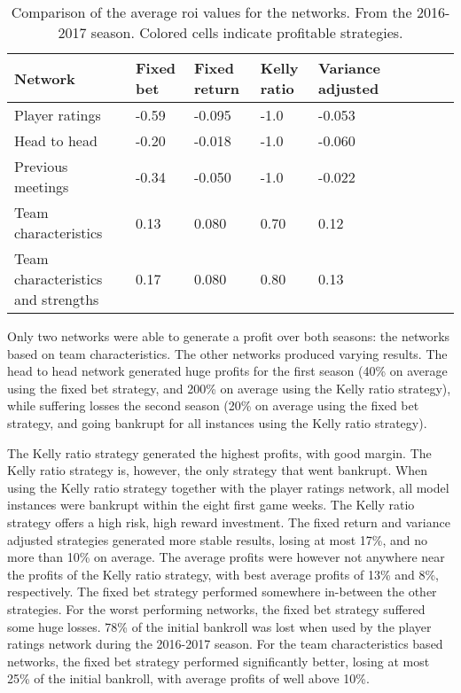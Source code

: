 \begin{table}
    \centering
    \begin{tabulary}{\textwidth}{| L || L |  L |  L |  L | L |  L |  L |  L |}
        \hline
        \textbf{Network}                    & \textbf{Fixed bet}        & \textbf{Fixed return}     & \textbf{Kelly ratio}      & \textbf{Variance adjusted} \\\hline
        Player ratings                      & -0.59                     & -0.095                    & -1.0                      & -0.053 \\\hline
        Head to head                        & -0.20                     & -0.018                    & -1.0                      & -0.060 \\\hline
        Previous meetings                   & -0.34                     & -0.050                    & -1.0                      & -0.022 \\\hline
        Team characteristics                &  0.13  &  0.080 &  0.70  &  0.12 \\\hline
        Team characteristics and strengths  &  0.17  &  0.080 &  0.80  &  0.13 \\\hline
    \end{tabulary}
    \caption{Comparison of the average \gls{roi} values for the networks. From the 2016-2017 season. Colored cells indicate profitable strategies.}
    \label{tab:results-model-comparison-2016-2017}
\end{table}

Only two networks were able to generate a profit over both seasons: the networks based on team characteristics. The other networks produced varying results. The head to head network generated huge profits for the first season (40\% on average using the fixed bet strategy, and 200\% on average using the Kelly ratio strategy), while suffering losses the second season (20\% on average using the fixed bet strategy, and going bankrupt for all instances using the Kelly ratio strategy).

The Kelly ratio strategy generated the highest profits, with good margin. The Kelly ratio strategy is, however, the only strategy that went bankrupt. When using the Kelly ratio strategy together with the player ratings network, all model instances were bankrupt within the eight first game weeks. The Kelly ratio strategy offers a high risk, high reward investment. The fixed return and variance adjusted strategies generated more stable results, losing at most 17\%, and no more than 10\% on average. The average profits were however not anywhere near the profits of the Kelly ratio strategy, with best average profits of 13\% and 8\%, respectively. The fixed bet strategy performed somewhere in-between the other strategies. For the worst performing networks, the fixed bet strategy suffered some huge losses. 78\% of the initial bankroll was lost when used by the player ratings network during the 2016-2017 season. For the team characteristics based networks, the fixed bet strategy performed significantly better, losing at most 25\% of the initial bankroll, with average profits of well above 10\%.